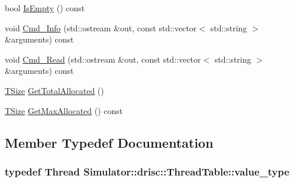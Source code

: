 \begin{DoxyCompactItemize}
\item 
bool \hyperlink{class_simulator_1_1drisc_1_1_thread_table_aa02783dc88c20a6b1a969d285a2479ff}{Is\+Empty} () const 
\item 
void \hyperlink{class_simulator_1_1drisc_1_1_thread_table_aa93c07b1c194839c6a68139289cc5285}{Cmd\+\_\+\+Info} (std\+::ostream \&out, const std\+::vector$<$ std\+::string $>$ \&arguments) const 
\item 
void \hyperlink{class_simulator_1_1drisc_1_1_thread_table_a3742c185e8f6ef381398601880d9d20a}{Cmd\+\_\+\+Read} (std\+::ostream \&out, const std\+::vector$<$ std\+::string $>$ \&arguments) const 
\item 
\hyperlink{namespace_simulator_aefe00209f3ea9f8e24874de522c3c3e7}{T\+Size} \hyperlink{class_simulator_1_1drisc_1_1_thread_table_a059d86a6c5af89d10c16f9d93984958e}{Get\+Total\+Allocated} ()
\item 
\hyperlink{namespace_simulator_aefe00209f3ea9f8e24874de522c3c3e7}{T\+Size} \hyperlink{class_simulator_1_1drisc_1_1_thread_table_a25376a350d8bc450359aed38a9948940}{Get\+Max\+Allocated} () const 
\end{DoxyCompactItemize}


\subsection{Member Typedef Documentation}
\hypertarget{class_simulator_1_1drisc_1_1_thread_table_a56eae29ce678ae87c43ddd725f48d392}{
\subsubsection[{value\+\_\+type}]{\setlength{\rightskip}{0pt plus 5cm}typedef {\bf Thread} {\bf Simulator\+::drisc\+::\+Thread\+Table\+::value\+\_\+type}}}\label{class_simulator_1_1drisc_1_1_thread_table_a56eae29ce678ae87c43ddd725f48d392}


